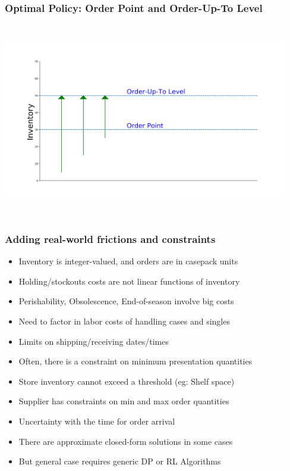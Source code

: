 \documentclass[handout]{beamer}
\begin{document}
\begin{frame}
\frametitle{Optimal Policy: Order Point and Order-Up-To Level}
\includegraphics[width=12.5cm, height=8.5cm]{op_otl.png}
\end{frame}

\begin{frame}
\frametitle{Adding real-world frictions and constraints}
\pause
\begin{itemize}[<+->]
\item Inventory is integer-valued, and orders are in casepack units
\item Holding/stockouts costs are not linear functions of inventory
\item Perishability, Obsolescence, End-of-season involve big costs 
\item Need to factor in labor costs of handling cases and singles
\item Limits on shipping/receiving dates/times
\item Often, there is a constraint on minimum presentation quantities
\item Store inventory cannot exceed a threshold (eg: Shelf space)
\item Supplier has constraints on min and max order quantities
\item Uncertainty with the time for order arrival
\item There are approximate closed-form solutions in some cases
\item But general case requires generic DP or RL Algorithms
\end{itemize}
\end{frame}
\end{document}
